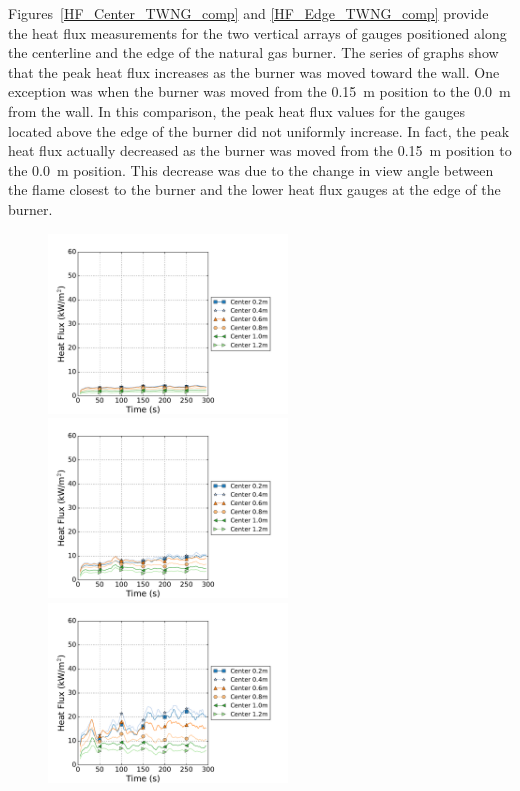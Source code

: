 \documentclass[twoside]{uocthesis}
\begin{document}
{Figures~\ref{HF_Center_TWNG_comp} and \ref{HF_Edge_TWNG_comp} provide the heat flux measurements for the two vertical arrays of gauges positioned along the centerline and the edge of the natural gas burner.  The series of graphs show that the peak heat flux increases as the burner was moved toward the wall. One exception was when the burner was moved from the 0.15~m position to the 0.0~m from the wall. In this comparison, the peak heat flux values for the gauges located above the edge of the burner did not uniformly increase.  In fact, the peak heat flux actually decreased as the burner was moved from the 0.15~m position to the 0.0~m position. This decrease was due to the change in view angle between the flame closest to the burner and the lower heat flux gauges at the edge of the burner.

\begin{figure}[ht!]
	\centering
	\includegraphics[width=2.5in]{../Figures/TWNG01_HF_Center_Avg}
	\includegraphics[width=2.5in]{../Figures/TWNG03_HF_Center_Avg}\\
	\includegraphics[width=2.5in]{../Figures/TWNG05_HF_Center_Avg}

\end{figure}}
\end{document}
